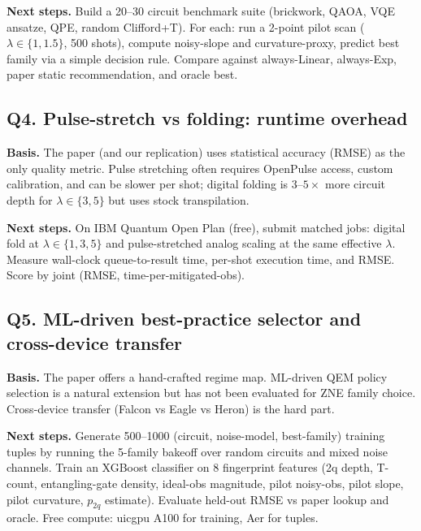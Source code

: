 \textbf{Next steps.} Build a 20--30 circuit benchmark suite (brickwork, QAOA,
VQE ansatze, QPE, random Clifford+T). For each: run a 2-point pilot scan
($\lambda \in \{1, 1.5\}$, 500 shots), compute noisy-slope and
curvature-proxy, predict best family via a simple decision rule. Compare against
always-Linear, always-Exp, paper static recommendation, and oracle best.

\subsection*{Q4. Pulse-stretch vs folding: runtime overhead}
\textbf{Basis.} The paper (and our replication) uses statistical accuracy (RMSE)
as the only quality metric. Pulse stretching often requires OpenPulse access,
custom calibration, and can be slower per shot; digital folding is
$3$--$5\times$ more circuit depth for $\lambda \in \{3, 5\}$ but uses stock
transpilation.

\textbf{Next steps.} On IBM Quantum Open Plan (free), submit matched jobs:
digital fold at $\lambda \in \{1, 3, 5\}$ and pulse-stretched analog scaling at
the same effective $\lambda$. Measure wall-clock queue-to-result time,
per-shot execution time, and RMSE. Score by joint (RMSE, time-per-mitigated-obs).

\subsection*{Q5. ML-driven best-practice selector and cross-device transfer}
\textbf{Basis.} The paper offers a hand-crafted regime map. ML-driven QEM policy
selection is a natural extension but has not been evaluated for ZNE family
choice. Cross-device transfer (Falcon vs Eagle vs Heron) is the hard part.

\textbf{Next steps.} Generate 500--1000 (circuit, noise-model, best-family)
training tuples by running the 5-family bakeoff over random circuits and mixed
noise channels. Train an XGBoost classifier on 8 fingerprint features (2q depth,
T-count, entangling-gate density, ideal-obs magnitude, pilot noisy-obs,
pilot slope, pilot curvature, $p_{2q}$ estimate). Evaluate held-out RMSE vs
paper lookup and oracle. Free compute: uicgpu A100 for training, Aer for tuples.
